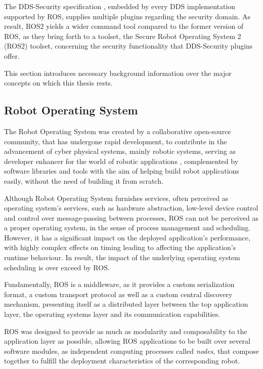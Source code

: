 The DDS-Security specification \cite{ros-dds-integration}, embedded by every DDS implementation supported by ROS, supplies multiple plugins regarding the security domain. As result, ROS2 yields a wider command tool compared to the former version of ROS, as they bring forth to a toolset, the Secure Robot Operating System 2 (ROS2) toolset, concerning the security functionality that DDS-Security plugins offer.

This section introduces necessary background information over the major concepts on which this thesis rests. 


\subsection{Robot Operating System}

The Robot Operating System was created by a collaborative open-source community, that has undergone rapid development, to contribute in the advancement of cyber physical systems, mainly robotic systems, serving as developer enhancer for the world of robotic applications \cite{diluoffo2018robot}, complemented by software libraries and tools with the aim of helping build robot applications easily, without the need of building it from scratch.

Although Robot Operating System furnishes services, often perceived as operating system's services, such as hardware abstraction, low-level device control and control over message-passing between processes, ROS can not be perceived as a proper operating system, in the sense of process management and scheduling. However, it has a significant impact on the deployed application's performance, with highly complex effects on timing leading to affecting the application's runtime behaviour. In result, the impact of the underlying operating system scheduling is over exceed by ROS. \cite{intro-ros, casini2019response} 

Fundamentally, ROS is a middleware, as it provides a custom serialization format, a custom transport protocol as well as a custom central discovery mechanism, presenting itself as a distributed layer between the top application layer, the operating systems layer and its communication capabilities. 

ROS was designed to provide as much as modularity and composability to the application layer \cite{casini2019response} as possible, allowing ROS applications to be built over several software modules, as independent computing processes called \textit{nodes}, that compose together to fulfill the deployment characteristics of the corresponding robot. \cite{maruyama2016exploring} 

